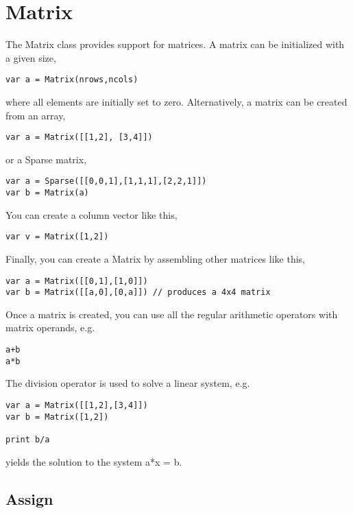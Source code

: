 \hypertarget{matrix}{%
\section{Matrix}\label{matrix}}

The Matrix class provides support for matrices. A matrix can be
initialized with a given size,

\begin{lstlisting}
var a = Matrix(nrows,ncols)
\end{lstlisting}

where all elements are initially set to zero. Alternatively, a matrix
can be created from an array,

\begin{lstlisting}
var a = Matrix([[1,2], [3,4]])
\end{lstlisting}

or a Sparse matrix,

\begin{lstlisting}
var a = Sparse([[0,0,1],[1,1,1],[2,2,1]])
var b = Matrix(a)
\end{lstlisting}

You can create a column vector like this,

\begin{lstlisting}
var v = Matrix([1,2])
\end{lstlisting}

Finally, you can create a Matrix by assembling other matrices like this,

\begin{lstlisting}
var a = Matrix([[0,1],[1,0]])
var b = Matrix([[a,0],[0,a]]) // produces a 4x4 matrix 
\end{lstlisting}

Once a matrix is created, you can use all the regular arithmetic
operators with matrix operands, e.g.

\begin{lstlisting}
a+b
a*b
\end{lstlisting}

The division operator is used to solve a linear system, e.g.

\begin{lstlisting}
var a = Matrix([[1,2],[3,4]])
var b = Matrix([1,2])

print b/a
\end{lstlisting}

yields the solution to the system a*x = b.

\hypertarget{assign}{%
\subsection{Assign}\label{assign}}

